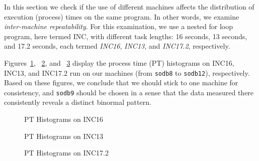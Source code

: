 \documentclass[10pt]{article}
\begin{document}
In this section we check if the use of different machines affects the distribution of execution (process) times on the same program. 
In other words, we examine {\em inter-machine repeatability}. For this examination, we use a nested for loop program, here termed INC, 
with different task lengths: 16 seconds, 13 seconds, and 17.2 seconds, each termed {\em INC16}, {\em INC13}, and {\em INC17.2}, respectively. 

Figures~\ref{fig:dm_1}, ~\ref{fig:dm_2}, and ~\ref{fig:dm_3} display the process time (PT) histograms on INC16, INC13, and INC17.2 run on our machines (from {\tt sodb8} to {\tt sodb12}), respectively. Based on these figures, we conclude that we should stick to one machine  for consistency, and {\tt sodb9} should be chosen in a sense that the data measured there consistently reveals a distinct binormal pattern.

\begin{figure}[h]
	\centering
	\caption{PT Histograms on INC16~\label{fig:dm_1}}
\end{figure}

\newpage
\clearpage

\begin{figure}[h]
	\centering
	\caption{PT Histograms on INC13~\label{fig:dm_2}}
\end{figure}

\newpage
\clearpage

\begin{figure}[h]
	\centering
	\caption{PT Histograms on INC17.2~\label{fig:dm_3}}
\end{figure}
\end{document}
